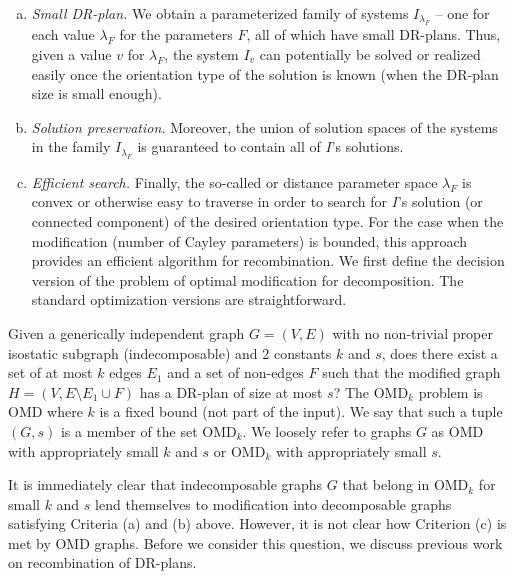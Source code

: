 \begin{enumerate}[(a)]
    \item
    {\sl Small DR-plan.}
    We obtain a  parameterized family of systems $I_{\lambda_F}$ -- one for each value $\lambda_F$ for the parameters $F$,  all of which have small DR-plans. Thus, given a value $v$ for $\lambda_F$, the system $I_v$ can potentially be solved or realized easily once the orientation type of the solution is known  (when the DR-plan size is small enough).


    \item
    {\sl Solution preservation.}
    Moreover, the union of solution spaces of the systems in the family $I_{\lambda_F}$ is guaranteed to contain all of $I$'s solutions.


    \item
    {\sl Efficient search.}
    Finally,  the so-called  or distance parameter space $\lambda_F$  is convex or otherwise easy to traverse in order to search for $I$'s solution (or connected component) of the desired orientation type. For the case when the modification (number of Cayley parameters) is bounded, this approach provides an efficient algorithm for recombination. We first define the decision version of the problem of optimal modification for decomposition. The standard optimization versions are straightforward.
\end{enumerate}



Given a generically independent graph $G = (V,E)$ with no non-trivial proper isostatic subgraph (indecomposable) and 2 constants $k$ and $s$, does there exist a set of at most $k$  edges $E_1$ and a set of non-edges $F$ such that the modified graph $H = (V, E\setminus E_1 \cup F)$ has a DR-plan of size at most $s$?  The OMD$_k$ problem is  OMD where $k$ is a fixed bound (not part of the input). We say that such a tuple $(G,s)$ is a member of the set OMD$_k$. We loosely refer to graphs $G$ as OMD with appropriately small $k$ and $s$ or OMD$_k$ with appropriately small $s$.


It is immediately clear that indecomposable graphs $G$ that belong in OMD$_k$ for small $k$ and $s$  lend themselves to modification  into decomposable graphs satisfying Criteria (a) and (b) above. However, it is not clear how Criterion (c) is met by OMD graphs. Before we consider this question, we discuss previous work on recombination of DR-plans.





